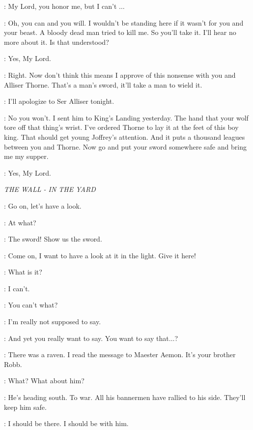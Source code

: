 \JON: My Lord, you honor me, but I can't $\ldots$  

\JEOR: Oh, you can and you will. I wouldn't be standing here if it wasn't for you and your beast. A bloody dead man tried to kill me. So you'll take it. I'll hear no more about it. Is that understood? 

\JON: Yes, My Lord. 

\JEOR: Right. Now don't think this means I approve of this nonsense with you and Alliser Thorne. That's a man's sword, it'll take a man to wield it. 

\JON: I'll apologize to Ser Alliser tonight. 

\JEOR: No you won't. I sent him to King's Landing yesterday. The hand that your wolf tore off that thing's wrist.  I've ordered Thorne to lay it at the feet of this boy king. That should get young Joffrey's attention. And it puts a thousand leagues between you and Thorne. Now go and put your sword somewhere safe and bring me my supper. 

\JON: Yes, My Lord. 


\scene

\textit{THE WALL - IN THE YARD} 


\PYP: Go on, let's have a look. 

\JON: At what? 

\GRENN: The sword! Show us the sword. 

\PYP: Come on, I want to have a look at it in the light. Give it here! 


\JON: What is it? 

\SAM: I can't. 

\JON: You can't what? 

\SAM: I'm really not supposed to say. 

\JON: And yet you really want to say. You want to say that$\ldots$? 

\SAM: There was a raven. I read the message to Maester Aemon. It's your brother Robb. 

\JON: What? What about him? 

\SAM: He's heading south. To war. All his bannermen have rallied to his side. They'll keep him safe. 

\JON: I should be there. I should be with him. 


